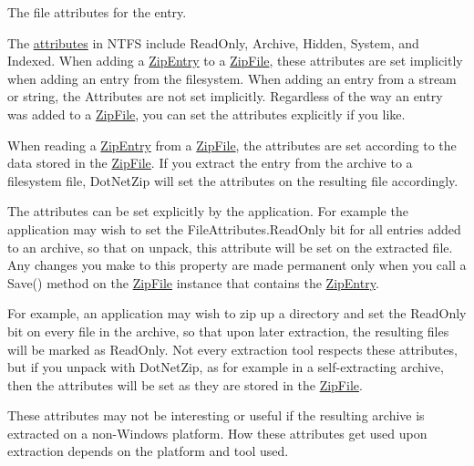 The file attributes for the entry. 

The \mbox{\hyperlink{}{attributes}} in N\+T\+FS include Read\+Only, Archive, Hidden, System, and Indexed. When adding a {\ttfamily \mbox{\hyperlink{class_super_tiled2_unity_1_1_ionic_1_1_zip_1_1_zip_entry}{Zip\+Entry}}} to a \mbox{\hyperlink{class_super_tiled2_unity_1_1_ionic_1_1_zip_1_1_zip_file}{Zip\+File}}, these attributes are set implicitly when adding an entry from the filesystem. When adding an entry from a stream or string, the Attributes are not set implicitly. Regardless of the way an entry was added to a {\ttfamily \mbox{\hyperlink{class_super_tiled2_unity_1_1_ionic_1_1_zip_1_1_zip_file}{Zip\+File}}}, you can set the attributes explicitly if you like. 

When reading a {\ttfamily \mbox{\hyperlink{class_super_tiled2_unity_1_1_ionic_1_1_zip_1_1_zip_entry}{Zip\+Entry}}} from a {\ttfamily \mbox{\hyperlink{class_super_tiled2_unity_1_1_ionic_1_1_zip_1_1_zip_file}{Zip\+File}}}, the attributes are set according to the data stored in the {\ttfamily \mbox{\hyperlink{class_super_tiled2_unity_1_1_ionic_1_1_zip_1_1_zip_file}{Zip\+File}}}. If you extract the entry from the archive to a filesystem file, Dot\+Net\+Zip will set the attributes on the resulting file accordingly. 

The attributes can be set explicitly by the application. For example the application may wish to set the {\ttfamily File\+Attributes.\+Read\+Only} bit for all entries added to an archive, so that on unpack, this attribute will be set on the extracted file. Any changes you make to this property are made permanent only when you call a {\ttfamily Save()} method on the {\ttfamily \mbox{\hyperlink{class_super_tiled2_unity_1_1_ionic_1_1_zip_1_1_zip_file}{Zip\+File}}} instance that contains the \mbox{\hyperlink{class_super_tiled2_unity_1_1_ionic_1_1_zip_1_1_zip_entry}{Zip\+Entry}}. 

For example, an application may wish to zip up a directory and set the Read\+Only bit on every file in the archive, so that upon later extraction, the resulting files will be marked as Read\+Only. Not every extraction tool respects these attributes, but if you unpack with Dot\+Net\+Zip, as for example in a self-\/extracting archive, then the attributes will be set as they are stored in the {\ttfamily \mbox{\hyperlink{class_super_tiled2_unity_1_1_ionic_1_1_zip_1_1_zip_file}{Zip\+File}}}. 

These attributes may not be interesting or useful if the resulting archive is extracted on a non-\/\+Windows platform. How these attributes get used upon extraction depends on the platform and tool used. 

